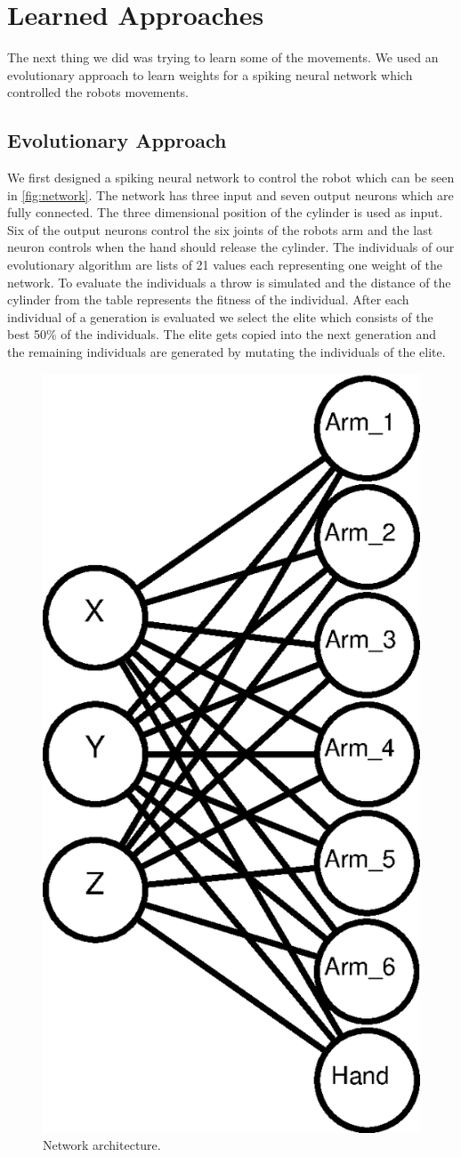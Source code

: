 \section{Learned Approaches}
The next thing we did was trying to learn some of the movements.
We used an evolutionary approach to learn weights for a spiking neural network which controlled the robots movements.

\subsection{Evolutionary Approach}
We first designed a spiking neural network to control the robot which can be seen in \autoref{fig:network}.
The network has three input and seven output neurons which are fully connected.
The three dimensional position of the cylinder is used as input.
Six of the output neurons control the six joints of the robots arm and the last neuron controls when the hand should release the cylinder.
The individuals of our evolutionary algorithm are lists of 21 values each representing one weight of the network.
To evaluate the individuals a throw is simulated and the distance of the cylinder from the table represents the fitness of the individual.
After each individual of a generation is evaluated we select the elite which consists of the best 50\% of the individuals.
The elite gets copied into the next generation and the remaining individuals are generated by mutating the individuals of the elite.

\begin{figure}[h]
\centering
\includegraphics[width=.5\columnwidth]{figures/net.eps}
\caption{Network architecture.}
\label{fig:network}
\end{figure}

